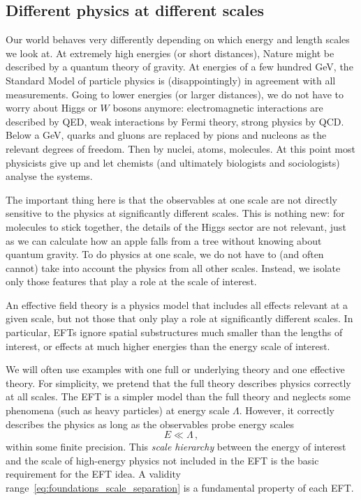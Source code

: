 \subsection{Different physics at different scales}
\label{sec:foundations_scales}


Our world behaves very differently depending on which energy and
length scales we look at. At extremely high energies (or short
distances), Nature might be described by a quantum theory of
gravity. At energies of a few hundred GeV, the Standard Model of
particle physics is (disappointingly) in agreement with
all measurements. Going to lower energies (or larger distances), we do not
have to worry about Higgs or $W$ bosons anymore:
electromagnetic interactions are described by QED, weak interactions
by Fermi theory, strong physics by QCD. Below a GeV,
quarks and gluons are replaced by pions and nucleons as the relevant
degrees of freedom. Then by nuclei, atoms, molecules. At this point
most physicists give up and let chemists (and ultimately biologists
and sociologists) analyse the systems.

The important thing here is that the observables at one scale are not
directly sensitive to the physics at significantly different
scales. This is nothing new: for molecules to stick together, the
details of the Higgs sector are not relevant, just as we can calculate how
an apple falls from a tree without knowing about quantum gravity. To
do physics at one scale, we do not have to (and often cannot) take
into account the physics from all other scales. Instead, we isolate
only those features that play a role at the scale of interest.

An effective field theory is a physics model that includes all effects
relevant at a given scale, but not those that only play a role at
significantly different scales. In particular, EFTs ignore spatial
substructures much smaller than the lengths of interest, or effects at
much higher energies than the energy scale of interest.

We will often use examples with one full or underlying theory and
one effective theory. For simplicity, we pretend that the full theory
describes physics correctly at all scales. The EFT is a simpler model
than the full theory and neglects some phenomena (such as heavy
particles) at energy scale $\Lambda$. However, it correctly describes
the physics as long as the observables probe energy scales
%
\begin{equation}
  E \ll \Lambda \,,
  \label{eq:foundations_scale_separation}
\end{equation}
%
within some finite precision. This \emph{scale hierarchy} between the
energy of interest and the scale of high-energy physics not included
in the EFT is the basic requirement for the EFT idea. A validity
range~\eqref{eq:foundations_scale_separation} is a fundamental property of each
EFT.





